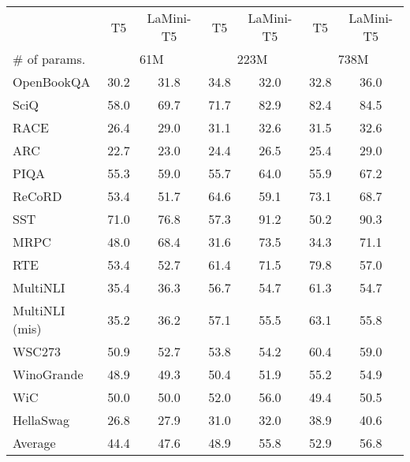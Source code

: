 \documentclass[11pt]{article}
\newcommand{\modelname}{LaMini\xspace}
\begin{document}
\begin{table*}[]
\centering
\small
\begin{tabular}{@{}lcccccc@{}}
\toprule
               & T5     & \modelname-T5  & T5     & \modelname-T5   & T5     & \modelname-T5   \\ \cmidrule(rl){2-3} \cmidrule(rl){4-5} \cmidrule(rl){6-7}
\# of params.  & \multicolumn{2}{c}{61M} & \multicolumn{2}{c}{223M} & \multicolumn{2}{c}{738M} \\
\midrule
OpenBookQA     & 30.2   & 31.8           & 34.8   & 32.0            & 32.8   & 36.0            \\
SciQ           & 58.0   & 69.7           & 71.7   & 82.9            & 82.4   & 84.5            \\
RACE           & 26.4   & 29.0           & 31.1   & 32.6            & 31.5   & 32.6            \\
ARC            & 22.7   & 23.0           & 24.4   & 26.5            & 25.4   & 29.0            \\
PIQA           & 55.3   & 59.0           & 55.7   & 64.0            & 55.9   & 67.2            \\
ReCoRD         & 53.4   & 51.7           & 64.6   & 59.1            & 73.1   & 68.7            \\
SST            & 71.0   & 76.8           & 57.3   & 91.2            & 50.2   & 90.3            \\
MRPC           & 48.0   & 68.4           & 31.6   & 73.5            & 34.3   & 71.1            \\
RTE            & 53.4   & 52.7           & 61.4   & 71.5            & 79.8   & 57.0            \\
MultiNLI       & 35.4   & 36.3           & 56.7   & 54.7            & 61.3   & 54.7            \\
MultiNLI (mis) & 35.2   & 36.2           & 57.1   & 55.5            & 63.1   & 55.8            \\
WSC273         & 50.9   & 52.7           & 53.8   & 54.2            & 60.4   & 59.0            \\
WinoGrande     & 48.9   & 49.3           & 50.4   & 51.9            & 55.2   & 54.9            \\
WiC            & 50.0   & 50.0           & 52.0   & 56.0            & 49.4   & 50.5            \\
HellaSwag      & 26.8   & 27.9           & 31.0   & 32.0            & 38.9   & 40.6            \\ \midrule
Average        & 44.4   & 47.6           & 48.9   & 55.8            & 52.9   & 56.8      

\end{tabular}
\end{table*}
\end{document}
